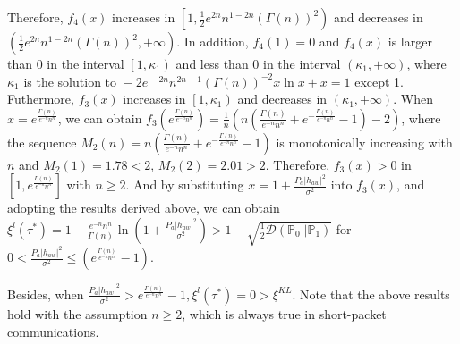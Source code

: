 \documentclass[conference]{IEEEtran}
\begin{document}
Therefore, $f_4(x)$ increases in $\left[ {1,\frac{1}{2}{e^{2n}}{n^{1 - 2n}}{{\left( {\Gamma (n)} \right)}^2}} \right)$ and decreases in $\left( {\frac{1}{2}{e^{2n}}{n^{1 - 2n}}{{\left( {\Gamma (n)} \right)}^2}, + \infty } \right)$. In addition, $f_4(1) = 0$ and $f_4(x)$ is larger than 0 in the interval $\left[ {1,{\kappa _1}} \right)$ and less than 0 in the interval $\left( {{\kappa _1}, + \infty } \right)$, where ${\kappa _1}$ is the solution to $ \!-\! 2{e^{ \!-\! 2n}}{n^{2n - 1}}{\left( {\Gamma (n)} \right)^{ - 2}}x\ln x \!+\! x \!\!\!=\!\!\! 1$ except 1. Futhermore, $f_3(x)$ increases in $\left[ {1,{\kappa _1}} \right)$ and decreases in $\left( {{\kappa _1}, + \infty } \right)$. When $x = {e^{\frac{{\Gamma (n)}}{{{e^{ - n}}{n^n}}}}}$, we can obtain $	{f_3}({e^{\frac{{\Gamma (n)}}{{{e^{ - n}}{n^n}}}}}) = \frac{1}{n}\left( {n\left( {\frac{{\Gamma (n)}}{{{e^{ - n}}{n^n}}} + {e^{ - \frac{{\Gamma (n)}}{{{e^{ - n}}{n^n}}}}} - 1} \right) - 2} \right)$, where the sequence ${M_2}(n) = n\left( {\frac{{\Gamma (n)}}{{{e^{ - n}}{n^n}}} + {e^{ - \frac{{\Gamma (n)}}{{{e^{ - n}}{n^n}}}}} - 1} \right)$ is monotonically increasing with $n$ and $M_2(1)=1.78<2$, $M_2(2)=2.01>2$. Therefore, $f_3(x)>0$ in $\left[ {1,{e^{\frac{{\Gamma (n)}}{{{e^{ - n}}{n^n}}}}}} \right]$ with $n \ge 2$. And by substituting $x = 1 + \frac{{P_a{{\left| {{h_{aw}}} \right|}^2}}}{{{\sigma ^2}}}$ into $f_3(x)$, and adopting the results derived above, we can obtain ${\xi ^{l}(\tau^*)}\!=\! 1 \!-\! \frac{{{e^{ - n}}{n^n}}}{{\Gamma (n)}}\ln \!\left(\! {1 \!+\! \frac{{{P_a}{{\left| {{h_{aw}}} \right|}^2}}}{{{\sigma ^2}}}} \!\right)\! \!>\! 1 \!-\! \sqrt {\frac{1}{2}\mathcal{D}\left( {{\mathbb{P}_0}||{\mathbb{P}_1}} \right)}$ for $0 < \frac{{{P_a}{{\left| {{h_{aw}}} \right|}^2}}}{{{\sigma ^2}}} \le \left( {{e^{\frac{{\Gamma \left( n \right)}}{{{e^{ - n}}{n^n}}}}} - 1} \right)$.

Besides, when $\frac{{{P_a}{{\left| {{h_{aw}}} \right|}^2}}}{{{\sigma ^2}}} > {e^{\frac{{\Gamma \left( n \right)}}{{{e^{ - n}}{n^n}}}}} - 1,{\xi ^{l}(\tau^*)} = 0 > {\xi ^{KL}}$. Note that the above results hold with the assumption $n \ge 2$, which is always true in short-packet communications.


         
   
\vspace{12pt}
\end{document}
